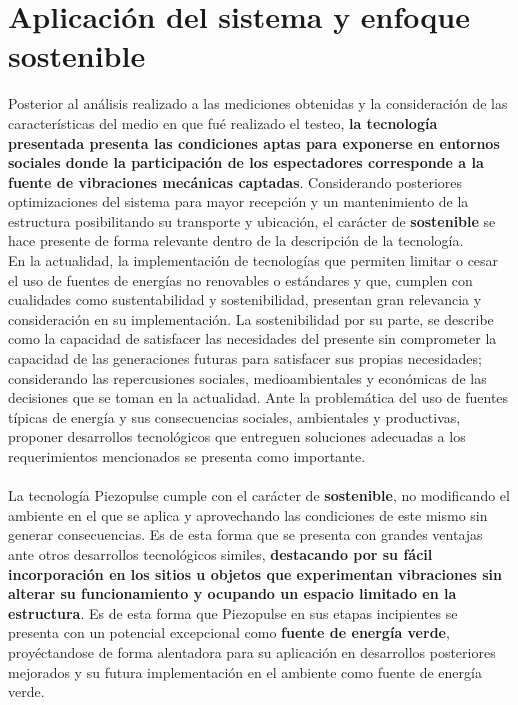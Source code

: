 \documentclass{article}
\begin{document}
\section{Aplicación del sistema y enfoque sostenible}
Posterior al análisis realizado a las mediciones obtenidas y la consideración de las características del medio en que fué realizado el testeo, \textbf{la tecnología presentada presenta las condiciones aptas para exponerse en entornos sociales donde la participación de los espectadores corresponde a la fuente de vibraciones mecánicas captadas}. Considerando posteriores optimizaciones del sistema para mayor recepción y un mantenimiento de la estructura posibilitando su transporte y ubicación, el carácter de \textbf{sostenible} se hace presente de forma relevante dentro de la descripción de la tecnología.\\
En la actualidad, la implementación de tecnologías que permiten limitar o cesar el uso de fuentes de energías no renovables o estándares y que, cumplen con cualidades como sustentabilidad y sostenibilidad, presentan gran relevancia y consideración en su implementación. La sostenibilidad por su parte, se describe como la capacidad de satisfacer las necesidades del presente sin comprometer la capacidad de las generaciones futuras para satisfacer sus propias necesidades; considerando las repercusiones sociales, medioambientales y económicas de las decisiones que se toman en la actualidad. Ante la problemática del uso de fuentes típicas de energía y sus consecuencias sociales, ambientales y productivas, proponer desarrollos tecnológicos que entreguen soluciones adecuadas a los requerimientos mencionados se presenta como importante. \\
\\
La tecnología Piezopulse cumple con el carácter de \textbf{sostenible}, no modificando el ambiente en el que se aplica y aprovechando las condiciones de este mismo sin generar consecuencias. Es de esta forma que se presenta con grandes ventajas ante otros desarrollos tecnológicos similes, \textbf{destacando por su fácil incorporación en los sitios u objetos que experimentan vibraciones sin alterar su funcionamiento y ocupando un espacio limitado en la estructura}. Es de esta forma que Piezopulse en sus etapas incipientes se presenta con un potencial excepcional como \textbf{fuente de energía verde}, proyéctandose de forma alentadora para su aplicación en desarrollos posteriores mejorados y su futura implementación en el ambiente como fuente de energía verde.
\end{document}
